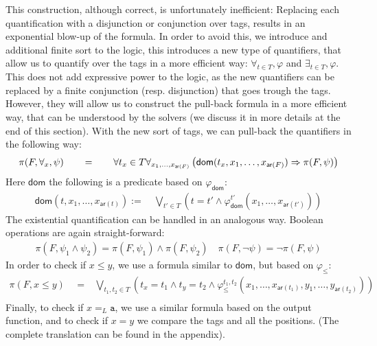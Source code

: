 This construction, although correct, is unfortunately inefficient:  Replacing each quantification with a disjunction or conjunction
over tags, results in an exponential blow-up of the formula. In order to avoid this, we introduce 
and additional finite sort to the logic,
this introduces a new type of quantifiers, that allow us to quantify over the tags in a more efficient way: $\forall_{t \in T}, \varphi$ 
and $\exists_{t \in T}, \varphi$. This does not add expressive power to the logic, as the new quantifiers can be replaced by 
a finite conjunction (resp. disjunction) that goes trough the tags. However, they will allow us to construct the pull-back formula
in a more efficient way, that can be understood by the solvers (we discuss it in more details at the end of this section).
With the new sort of tags, we can pull-back the quantifiers in the following way: 
\[ 
\begin{tabular}{ccc}
   $ \pi(F, \forall_{x}, \psi)$ & $\quad = \quad$ & $\forall{t_x \in T} \forall_{x_1, \ldots, x_{\mathsf{ar}(F)}} \left( {\mathsf{dom}}(t_x, x_1, \ldots, x_{\mathsf{ar}(F)}) \Rightarrow \pi(F, \psi)\right)$
\end{tabular}
\]
Here $\mathsf{dom}$ the following is a predicate based on $\varphi_{\mathsf{dom}}$:
\begin{align*}
    \mathsf{dom}(t, x_1, \ldots, x_{\mathsf{ar}(t)}) :=&~ \bigvee_{t' \in T} \left( t = t' \wedge \varphi_{\mathsf{dom}}^{t'}(x_1, \ldots, x_{\mathsf{ar}(t')}) \right)
\end{align*}
The existential quantification can be handled in an analogous way. Boolean operations are again straight-forward: 
\begin{align*}
    \pi(F, \psi_1 \wedge \psi_2) = \pi(F, \psi_1) \wedge \pi(F, \psi_2) \quad \pi(F, \neg \psi) = \neg \pi(F, \psi)
\end{align*}
In order to check if $x \leq y$, we use a formula similar to $\mathsf{dom}$, but based on $\varphi_\leq$:
\begin{align*}
   \pi(F, x \leq y) & \ \ =  &~ \bigvee_{t_1, t_2 \in T} \left( t_x = t_1 \wedge t_y = t_2 \wedge \varphi_{\leq}^{t_1, t_2}(x_1, \ldots, x_{\mathsf{ar}(t_1)}, y_1, \ldots, y_{\mathsf{ar}(t_2)}) \right) \\
\end{align*}
Finally, to check if $x =_L \mathtt{a}$, we use a similar formula based on the output function, and to check if $x = y$ we compare the tags and all the positions. (The complete translation can be found in the appendix).



